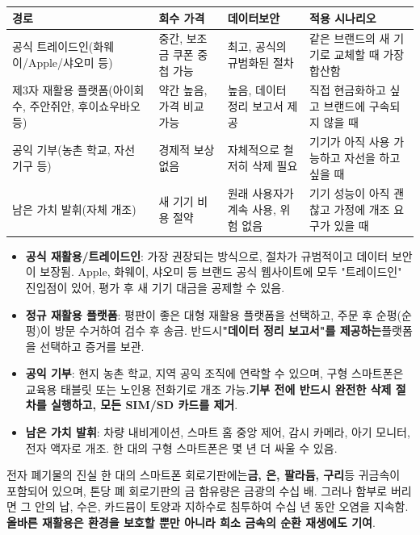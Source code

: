 \begin{center}
\begin{tabularx}{\linewidth}{|X|X|X|X|}
\hline
\textbf{경로} & \textbf{회수 가격} & \textbf{데이터보안} & \textbf{적용 시나리오} \tabularnewline
\hline
공식 트레이드인(화웨이/Apple/샤오미 등) & 중간, 보조금 쿠폰 중첩 가능 & 최고, 공식의 규범화된 절차 & 같은 브랜드의 새 기기로 교체할 때 가장 합산함 \tabularnewline
제3자 재활용 플랫폼(아이회수, 주안쥐안, 후이쇼우바오 등) & 약간 높음, 가격 비교 가능 & 높음, 데이터 정리 보고서 제공 & 직접 현금화하고 싶고 브랜드에 구속되지 않을 때 \tabularnewline
공익 기부(농촌 학교, 자선 기구 등) & 경제적 보상 없음 & 자체적으로 철저히 삭제 필요 & 기기가 아직 사용 가능하고 자선을 하고 싶을 때 \tabularnewline
남은 가치 발휘(자체 개조) & 새 기기 비용 절약 & 원래 사용자가 계속 사용, 위험 없음 & 기기 성능이 아직 괜찮고 가정에 개조 요구가 있을 때 \tabularnewline
\hline
\end{tabularx}
\end{center}

\begin{itemize}
  \item \textbf{공식 재활용/트레이드인}: 가장 권장되는 방식으로, 절차가 규범적이고 데이터 보안이 보장됨. Apple, 화웨이, 샤오미 등 브랜드 공식 웹사이트에 모두 "트레이드인" 진입점이 있어, 평가 후 새 기기 대금을 공제할 수 있음.
  \item \textbf{정규 재활용 플랫폼}: 평판이 좋은 대형 재활용 플랫폼을 선택하고, 주문 후 순펑(순펑)이 방문 수거하여 검수 후 송금. 반드시\textbf{"데이터 정리 보고서"를 제공하는}플랫폼을 선택하고 증거를 보관.
  \item \textbf{공익 기부}: 현지 농촌 학교, 지역 공익 조직에 연락할 수 있으며, 구형 스마트폰은 교육용 태블릿 또는 노인용 전화기로 개조 가능.\textbf{기부 전에 반드시 완전한 삭제 절차를 실행하고, 모든 SIM/SD 카드를 제거}.
  \item \textbf{남은 가치 발휘}: 차량 내비게이션, 스마트 홈 중앙 제어, 감시 카메라, 아기 모니터, 전자 액자로 개조. 한 대의 구형 스마트폰은 몇 년 더 싸울 수 있음.
\end{itemize}

\begin{tcbinfo}{전자 폐기물의 진실}
한 대의 스마트폰 회로기판에는\textbf{금, 은, 팔라듐, 구리}등 귀금속이 포함되어 있으며, 톤당 폐 회로기판의 금 함유량은 금광의 수십 배. 그러나 함부로 버리면 그 안의 납, 수은, 카드뮴이 토양과 지하수로 침투하여 수십 년 동안 오염을 지속함.\textbf{올바른 재활용은 환경을 보호할 뿐만 아니라 희소 금속의 순환 재생에도 기여}.

\end{tcbinfo}

